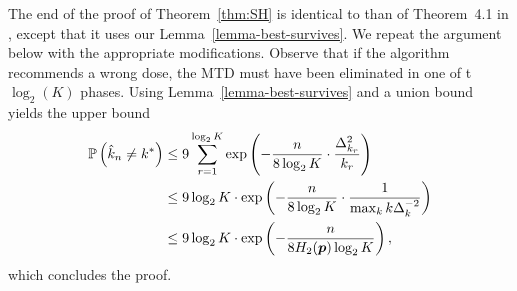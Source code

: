 %
%
The end of the proof of Theorem~\ref{thm:SH} is identical to than of Theorem~4.1 in \cite{Karnin13}, except that it uses our Lemma~\ref{lemma-best-survives}. We repeat the argument below with the appropriate modifications. 
Observe that if the algorithm recommends a wrong dose, the MTD must have been eliminated in one of t $\log_2(K)$ phases. Using Lemma~\ref{lemma-best-survives} and a union bound yields the upper bound
\begin{align*}
\mathbb{P}\left(\hat{k}_n \neq k^*\right) &\leq 9 \sum_{r=1}^{\log_2 K} \exp \left(
	- \frac{n}{8 \log_2 K} \cdot \frac{\Delta^2_{k_r}}{k_r}
	\right)	
\\
	&\le 9 \log_2 K \cdot \exp \left(
		- \frac{n}{8 \log_2 K} \cdot \frac{1}{\max_k k \Delta^{-2}_k}
	\right)
\\
	&\le 9 \log_2 K \cdot \exp \left(
		- \frac{n}{8 H_2(\bm p) \log_2 K}
	\right),
\end{align*}
which concludes the proof.

